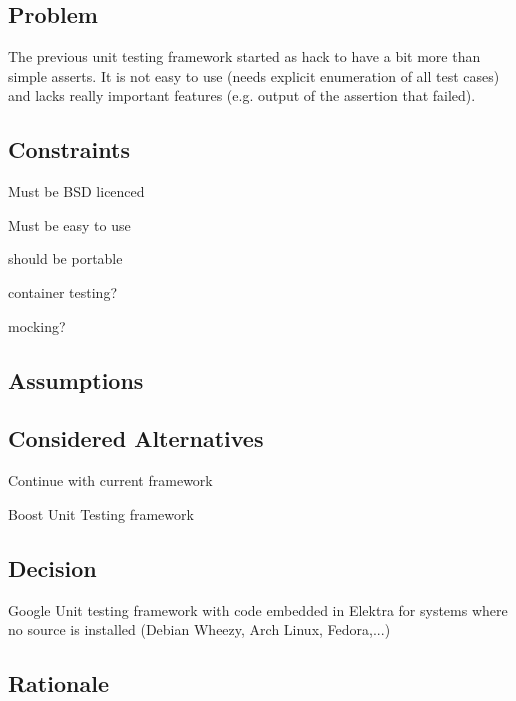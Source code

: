 \subsection*{Problem}

The previous unit testing framework started as hack to have a bit more than simple asserts. It is not easy to use (needs explicit enumeration of all test cases) and lacks really important features (e.\+g. output of the assertion that failed).

\subsection*{Constraints}


\begin{DoxyItemize}
\item Must be B\+SD licenced
\item Must be easy to use
\item should be portable
\item container testing?
\item mocking?
\end{DoxyItemize}

\subsection*{Assumptions}

\subsection*{Considered Alternatives}


\begin{DoxyItemize}
\item Continue with current framework
\item Boost Unit Testing framework
\end{DoxyItemize}

\subsection*{Decision}


\begin{DoxyItemize}
\item Google Unit testing framework with code embedded in Elektra for systems where no source is installed (Debian Wheezy, Arch Linux, Fedora,...)
\end{DoxyItemize}

\subsection*{Rationale}



